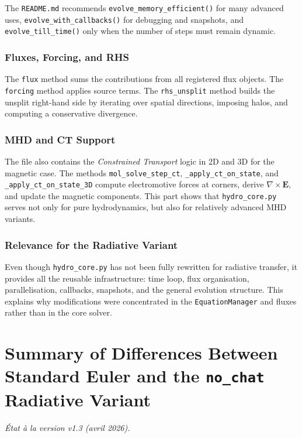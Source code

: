 \documentclass[a4paper, 11pt]{article}
\begin{document}
The \texttt{README.md} recommends \texttt{evolve\_memory\_efficient()} for many advanced uses, \texttt{evolve\_with\_callbacks()} for debugging and snapshots, and \texttt{evolve\_till\_time()} only when the number of steps must remain dynamic.

\subsubsection*{Fluxes, Forcing, and RHS}
The \texttt{flux} method sums the contributions from all registered flux objects. The \texttt{forcing} method applies source terms. The \texttt{rhs\_unsplit} method builds the unsplit right-hand side by iterating over spatial directions, imposing halos, and computing a conservative divergence.

\subsubsection*{MHD and CT Support}
The file also contains the \emph{Constrained Transport} logic in 2D and 3D for the magnetic case. The methods \texttt{mol\_solve\_step\_ct}, \texttt{\_apply\_ct\_on\_state}, and \texttt{\_apply\_ct\_on\_state\_3D} compute electromotive forces at corners, derive \(\nabla \times \mathbf{E}\), and update the magnetic components. This part shows that \texttt{hydro\_core.py} serves not only for pure hydrodynamics, but also for relatively advanced MHD variants.

\subsubsection*{Relevance for the Radiative Variant}
Even though \texttt{hydro\_core.py} has not been fully rewritten for radiative transfer, it provides all the reusable infrastructure: time loop, flux organisation, parallelisation, callbacks, snapshots, and the general evolution structure. This explains why modifications were concentrated in the \texttt{EquationManager} and fluxes rather than in the core solver.

\section{Summary of Differences Between Standard Euler and the \texttt{no\_chat} Radiative Variant}
\textit{État à la version v1.3 (avril 2026).}
\end{document}

